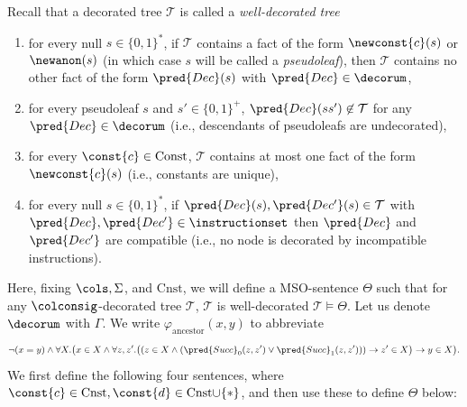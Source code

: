 Recall that a decorated tree $\mathcal{T}$ is called a \emph{well-decorated tree} \iffi
\begin{enumerate}
	\item for every null $s\in\{ 0,1 \}^*$, if $\mathcal{T}$ contains a fact of the form $\newconst{c}(s)$ or $\newanon(s)$ (in which case $s$ will be called a \emph{pseudoleaf}), then $\mathcal{T}$ contains no other fact of the form $\pred{Dec}(s)$ with $\pred{Dec}\in\decorum$,
	\item for every pseudoleaf $s$ and $s' \in \{0,1\}^+$, $\pred{Dec}(ss')\not\in \mathcal{T}$ for any $\pred{Dec}\in\decorum$  (i.e., descendants of pseudoleafs are undecorated),  
	\item for every $\const{c}\in\mathrm{Const}$, $\mathcal{T}$ contains at most one fact of the form $\newconst{c}(s)$ (i.e., constants are unique),
	\item for every null $s\in\{ 0,1 \}^*$, if $\pred{Dec}(s),\pred{Dec'}(s) \in \mathcal{T}$ with $\pred{Dec},\pred{Dec'} \in \instructionset$ then $\pred{Dec}$ and $\pred{Dec'}$ are compatible (i.e.,  
	no node is decorated by incompatible instructions).
\end{enumerate}
Here, fixing $\cols, \Sigma$, and $\mathrm{Cnst}$, we will define a MSO-sentence $\Theta$ such that for any $\colconsig$-decorated tree $\mathcal{T}$, $\mathcal{T}$ is well-decorated \iffi $\mathcal{T}\vDash \Theta$.
\newline
Let us denote $\decorum$ with $\Gamma$. We write $\varphi_{\mathrm{ancestor}}(x,y)$ to abbreviate $$\neg(x = y) \wedge \forall X. \big(x\in X \land \forall z, z'. \big((z\in X \land (\pred{Succ}_0(z, z')\lor \pred{Succ}_{1}(z,z')) )\rightarrow z'\in X\big) \rightarrow y \in X\big).$$We first define the following four sentences, where $\const{c}\in\mathrm{Cnst}, \const{d}\in\mathrm{Cnst}{\cup}\{ \ast \}$, and then use these to define $\Theta$ below:
